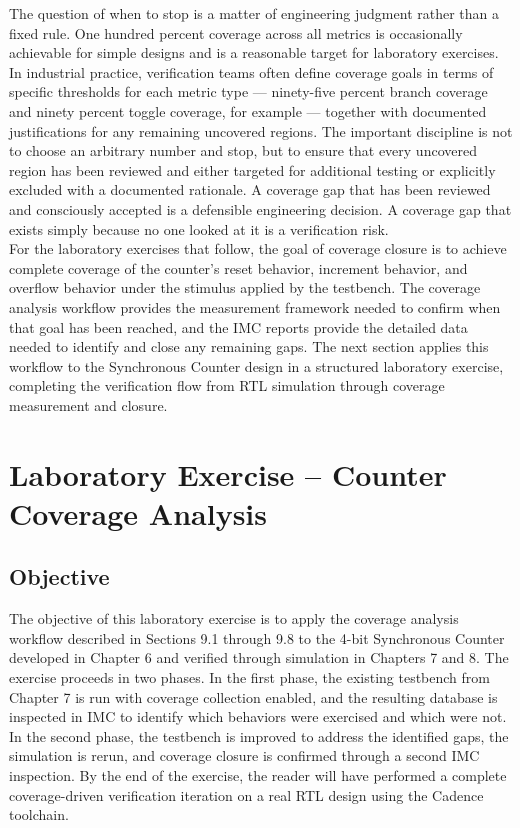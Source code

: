 The question of when to stop is a matter of engineering judgment rather than a fixed rule. One hundred percent coverage across all metrics is occasionally achievable for simple designs and is a reasonable target for laboratory exercises. In industrial practice, verification teams often define coverage goals in terms of specific thresholds for each metric type — ninety-five percent branch coverage and ninety percent toggle coverage, for example — together with documented justifications for any remaining uncovered regions. The important discipline is not to choose an arbitrary number and stop, but to ensure that every uncovered region has been reviewed and either targeted for additional testing or explicitly excluded with a documented rationale. A coverage gap that has been reviewed and consciously accepted is a defensible engineering decision. A coverage gap that exists simply because no one looked at it is a verification risk.\\

For the laboratory exercises that follow, the goal of coverage closure is to achieve complete coverage of the counter's reset behavior, increment behavior, and overflow behavior under the stimulus applied by the testbench. The coverage analysis workflow provides the measurement framework needed to confirm when that goal has been reached, and the IMC reports provide the detailed data needed to identify and close any remaining gaps. The next section applies this workflow to the Synchronous Counter design in a structured laboratory exercise, completing the verification flow from RTL simulation through coverage measurement and closure.\\

\section{Laboratory Exercise -- Counter Coverage Analysis}


\subsection{Objective}

The objective of this laboratory exercise is to apply the coverage analysis workflow described in Sections 9.1 through 9.8 to the 4-bit Synchronous Counter developed in Chapter 6 and verified through simulation in Chapters 7 and 8. The exercise proceeds in two phases. In the first phase, the existing testbench from Chapter 7 is run with coverage collection enabled, and the resulting database is inspected in IMC to identify which behaviors were exercised and which were not. In the second phase, the testbench is improved to address the identified gaps, the simulation is rerun, and coverage closure is confirmed through a second IMC inspection. By the end of the exercise, the reader will have performed a complete coverage-driven verification iteration on a real RTL design using the Cadence toolchain.\

